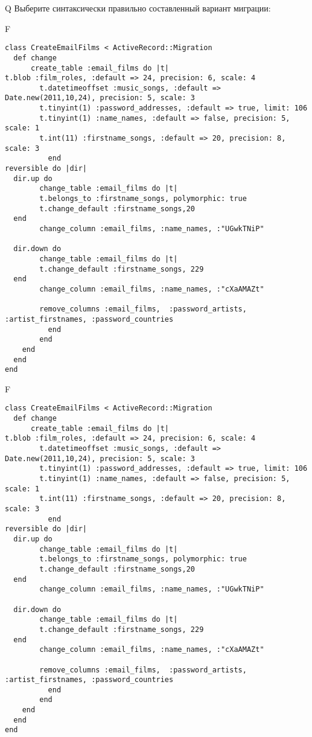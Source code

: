 Q
Выберите синтаксически правильно составленный вариант миграции:

F
\begin{verbatim}
class CreateEmailFilms < ActiveRecord::Migration
  def change
	  create_table :email_films do |t|
t.blob :film_roles, :default => 24, precision: 6, scale: 4
		t.datetimeoffset :music_songs, :default => Date.new(2011,10,24), precision: 5, scale: 3
		t.tinyint(1) :password_addresses, :default => true, limit: 106
		t.tinyint(1) :name_names, :default => false, precision: 5, scale: 1
		t.int(11) :firstname_songs, :default => 20, precision: 8, scale: 3
		  end
reversible do |dir|
  dir.up do
		change_table :email_films do |t|
		t.belongs_to :firstname_songs, polymorphic: true
 		t.change_default :firstname_songs,20
  end
 		change_column :email_films, :name_names, :"UGwkTNiP"
   
  dir.down do
		change_table :email_films do |t|
		t.change_default :firstname_songs, 229
  end
 		change_column :email_films, :name_names, :"cXaAMAZt"
   
		remove_columns :email_films,  :password_artists, :artist_firstnames, :password_countries 
	      end
	    end
    end 
  end
end

\end{verbatim}

F
\begin{verbatim}
class CreateEmailFilms < ActiveRecord::Migration
  def change
	  create_table :email_films do |t|
t.blob :film_roles, :default => 24, precision: 6, scale: 4
		t.datetimeoffset :music_songs, :default => Date.new(2011,10,24), precision: 5, scale: 3
		t.tinyint(1) :password_addresses, :default => true, limit: 106
		t.tinyint(1) :name_names, :default => false, precision: 5, scale: 1
		t.int(11) :firstname_songs, :default => 20, precision: 8, scale: 3
		  end
reversible do |dir|
  dir.up do
		change_table :email_films do |t|
		t.belongs_to :firstname_songs, polymorphic: true
 		t.change_default :firstname_songs,20
  end
 		change_column :email_films, :name_names, :"UGwkTNiP"
   
  dir.down do
		change_table :email_films do |t|
		t.change_default :firstname_songs, 229
  end
 		change_column :email_films, :name_names, :"cXaAMAZt"
   
		remove_columns :email_films,  :password_artists, :artist_firstnames, :password_countries 
	      end
	    end
    end 
  end
end

\end{verbatim}

